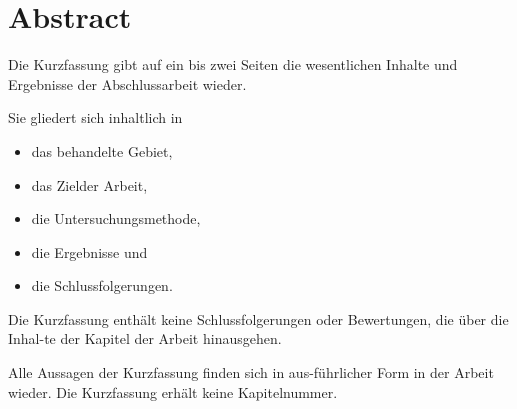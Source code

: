 \hypertarget{abstract}{%
\section{Abstract}\label{abstract}}

Die Kurzfassung gibt auf ein bis zwei Seiten die wesentlichen Inhalte
und Ergebnisse der Abschlussarbeit wieder.

Sie gliedert sich inhaltlich in

\begin{itemize}
\tightlist
\item
  das behandelte Gebiet,
\item
  das Zielder Arbeit,
\item
  die Untersuchungsmethode,
\item
  die Ergebnisse und
\item
  die Schlussfolgerungen.
\end{itemize}

Die Kurzfassung enthält keine Schlussfolgerungen oder Bewertungen, die
über die Inhal-te der Kapitel der Arbeit hinausgehen.

Alle Aussagen der Kurzfassung finden sich in aus-führlicher Form in der
Arbeit wieder. Die Kurzfassung erhält keine Kapitelnummer.
